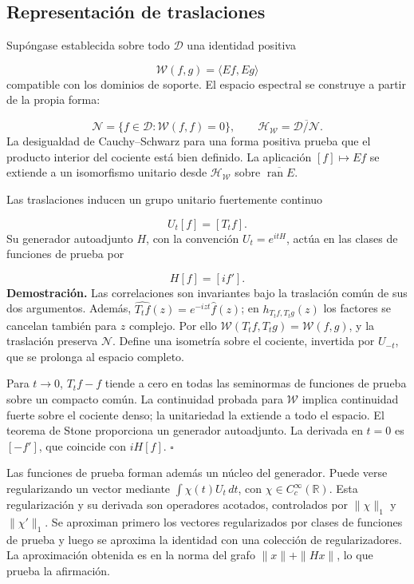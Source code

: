 \subsection{Representación de traslaciones}
\label{rz:traslaciones}
Supóngase establecida sobre todo \(\mathcal D\) una identidad positiva

\[
\mathscr W(f,g)=\langle Ef,Eg\rangle
\]
compatible con los dominios de soporte. El espacio espectral se construye a partir de la propia forma:

\[
\mathcal N=\{f\in\mathcal D:\mathscr W(f,f)=0\},\qquad
\mathcal H_{\mathscr W}
=\overline{\mathcal D/\mathcal N}.
\]
La desigualdad de Cauchy–Schwarz para una forma positiva prueba que el producto interior del cociente está bien definido. La aplicación \([f]\mapsto Ef\) se extiende a un isomorfismo unitario desde \(\mathcal H_{\mathscr W}\) sobre \(\overline{\operatorname{ran}E}\).

Las traslaciones inducen un grupo unitario fuertemente continuo

\[
U_t[f]=[T_tf].
\]
Su generador autoadjunto \(H\), con la convención \(U_t=e^{itH}\), actúa en las clases de funciones de prueba por

\[
H[f]=[i f'].
\]
\textbf{Demostración.} Las correlaciones son invariantes bajo la traslación común de sus dos argumentos. Además, \(\widehat{T_tf}(z)=e^{-izt}\widehat f(z)\); en \(h_{T_tf,T_tg}(z)\) los factores se cancelan también para \(z\) complejo. Por ello \(\mathscr W(T_tf,T_tg)=\mathscr W(f,g)\), y la traslación preserva \(\mathcal N\). Define una isometría sobre el cociente, invertida por \(U_{-t}\), que se prolonga al espacio completo.

Para \(t\to0\), \(T_tf-f\) tiende a cero en todas las seminormas de funciones de prueba sobre un compacto común. La continuidad probada para \(\mathscr W\) implica continuidad fuerte sobre el cociente denso; la unitariedad la extiende a todo el espacio. El teorema de Stone proporciona un generador autoadjunto. La derivada en \(t=0\) es \([-f']\), que coincide con \(iH[f]\). \hfill\(\square\)

Las funciones de prueba forman además un núcleo del generador. Puede verse regularizando un vector mediante \(\int\chi(t)U_t\,dt\), con \(\chi\in C_c^\infty(\mathbb R)\). Esta regularización y su derivada son operadores acotados, controlados por \(\|\chi\|_1\) y \(\|\chi'\|_1\). Se aproximan primero los vectores regularizados por clases de funciones de prueba y luego se aproxima la identidad con una colección de regularizadores. La aproximación obtenida es en la norma del grafo \(\|x\|+\|Hx\|\), lo que prueba la afirmación.

